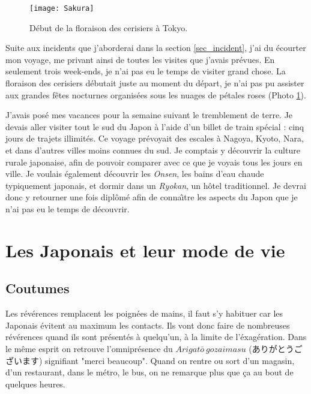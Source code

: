 \documentclass[11pt,journal]{RapportFR}
\begin{document}
\begin{CJK*}{UTF8}{min}
\begin{figure}[!t]
\centering
\texttt{[image: Sakura]}
\caption{D\'ebut de la floraison des cerisiers \`a Tokyo.}
\label{fig_sakura}
\end{figure}

Suite aux incidents que j'aborderai dans la section \ref{sec_incident}, j'ai du \'ecourter mon voyage, me privant ainsi de toutes les visites que j'avais pr\'evues.
En seulement trois week-ends, je n'ai pas eu le temps de visiter grand chose. 
La floraison des cerisiers d\'ebutait juste au moment du d\'epart, je n'ai pas pu assister aux grandes f\^etes nocturnes organis\'ees sous les nuages de p\'etales roses (Photo \ref{fig_sakura}).  

J'avais pos\'e mes vacances pour la semaine suivant le tremblement de terre. Je devais aller visiter tout le sud du Japon \`a l'aide d'un billet de train sp\'ecial : cinq jours de trajets illimit\'es.
Ce voyage pr\'evoyait des escales \`a Nagoya, Kyoto, Nara, et dans d'autres villes moins connues du sud. Je comptais y d\'ecouvrir la culture rurale japonaise, afin de pouvoir comparer avec ce que je voyais tous les jours en ville. Je voulais \'egalement d\'ecouvrir les \textit{Onsen}, les bains d'eau chaude typiquement japonais, et dormir dans un \textit{Ryokan}, un h\^otel traditionnel. Je devrai donc y retourner une fois dipl\^om\'e afin de conna\^\i tre les aspects du Japon que je n'ai pas eu le temps de d\'ecouvrir.




\section{Les Japonais et leur mode de vie} 
\label{sec_mode_de_vie}


\subsection{Coutumes}

Les r\'ev\'erences remplacent les poign\'ees de mains, il faut s'y habituer car les Japonais \'evitent au maximum les contacts. Ils vont donc faire de nombreuses r\'ev\'erences quand ils sont pr\'esent\'es \`a quelqu'un, \`a la limite de l'\'exag\'eration. Dans le m\^eme esprit on retrouve l'omnipr\'esence du $Arigat\bar{o}~ gozaimasu$ (ありがとうございます) signifiant "merci beaucoup". Quand on rentre ou sort d'un magasin, d'un restaurant, dans le m\'etro, le bus, on ne remarque plus que \c{c}a au bout de quelques heures.


\end{CJK*}
\end{document}
